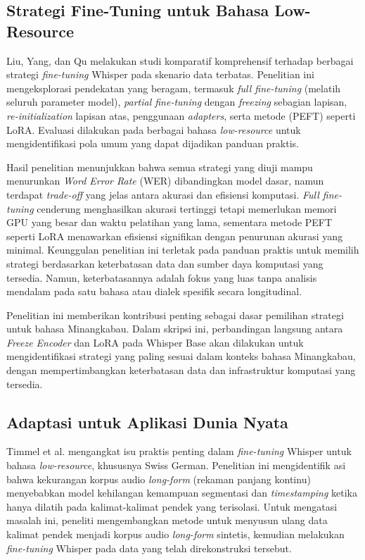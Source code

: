 \subsection{Strategi Fine-Tuning untuk Bahasa Low-Resource}

Liu, Yang, dan Qu \cite{liu2024exploration} melakukan studi komparatif komprehensif terhadap berbagai strategi \textit{fine-tuning} Whisper pada skenario data terbatas. Penelitian ini mengeksplorasi pendekatan yang beragam, termasuk \textit{full fine-tuning} (melatih seluruh parameter model), \textit{partial fine-tuning} dengan \textit{freezing} sebagian lapisan, \textit{re-initialization} lapisan atas, penggunaan \textit{adapters}, serta metode  (PEFT) seperti LoRA. Evaluasi dilakukan pada berbagai bahasa \textit{low-resource} untuk mengidentifikasi pola umum yang dapat dijadikan panduan praktis.

Hasil penelitian menunjukkan bahwa semua strategi yang diuji mampu menurunkan \textit{Word Error Rate} (WER) dibandingkan model dasar, namun terdapat \textit{trade-off} yang jelas antara akurasi dan efisiensi komputasi. \textit{Full fine-tuning} cenderung menghasilkan akurasi tertinggi tetapi memerlukan memori GPU yang besar dan waktu pelatihan yang lama, sementara metode PEFT seperti LoRA menawarkan efisiensi signifikan dengan penurunan akurasi yang minimal. Keunggulan penelitian ini terletak pada panduan praktis untuk memilih strategi berdasarkan keterbatasan data dan sumber daya komputasi yang tersedia. Namun, keterbatasannya adalah fokus yang luas tanpa analisis mendalam pada satu bahasa atau dialek spesifik secara longitudinal.

Penelitian ini memberikan kontribusi penting sebagai dasar pemilihan strategi untuk bahasa Minangkabau. Dalam skripsi ini, perbandingan langsung antara \textit{Freeze Encoder} dan LoRA pada Whisper Base akan dilakukan untuk mengidentifikasi strategi yang paling sesuai dalam konteks bahasa Minangkabau, dengan mempertimbangkan keterbatasan data dan infrastruktur komputasi yang tersedia.

\subsection{Adaptasi untuk Aplikasi Dunia Nyata}

Timmel et al. \cite{timmel2024finetune} mengangkat isu praktis penting dalam \textit{fine-tuning} Whisper untuk bahasa \textit{low-resource}, khususnya Swiss German. Penelitian ini mengidentifik asi bahwa kekurangan korpus audio \textit{long-form} (rekaman panjang kontinu) menyebabkan model kehilangan kemampuan segmentasi dan \textit{timestamping} ketika hanya dilatih pada kalimat-kalimat pendek yang terisolasi. Untuk mengatasi masalah ini, peneliti mengembangkan metode untuk menyusun ulang data kalimat pendek menjadi korpus audio \textit{long-form} sintetis, kemudian melakukan \textit{fine-tuning} Whisper pada data yang telah direkonstruksi tersebut.

